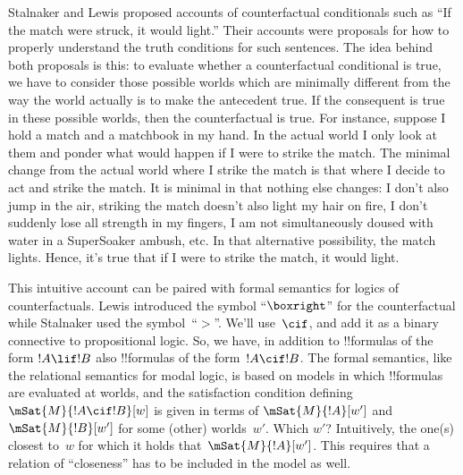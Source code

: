 \documentclass[../../../include/open-logic-section]{subfiles}
\begin{document}


Stalnaker and Lewis proposed accounts of counterfactual conditionals
such as ``If the match were struck, it would light.''  Their accounts
were proposals for how to properly understand the truth conditions for
such sentences. The idea behind both proposals is this: to evaluate
whether a counterfactual conditional is true, we have to consider
those possible worlds which are minimally different from the way the
world actually is to make the antecedent true. If the consequent is
true in these possible worlds, then the counterfactual is true. For
instance, suppose I hold a match and a matchbook in my hand. In the
actual world I only look at them and ponder what would happen if I
were to strike the match. The minimal change from the actual world
where I strike the match is that where I decide to act and strike the
match. It is minimal in that nothing else changes: I don't also jump
in the air, striking the match doesn't also light my hair on fire, I
don't suddenly lose all strength in my fingers, I am not simultaneously
doused with water in a SuperSoaker ambush, etc. In that alternative
possibility, the match lights. Hence, it's true that if I were to
strike the match, it would light.

This intuitive account can be paired with formal semantics for logics
of counterfactuals.  Lewis introduced the symbol ``$\boxright$'' for
the counterfactual while Stalnaker used the symbol~``$>$''. We'll
use~$\cif$, and add it as a binary connective to propositional
logic. So, we have, in addition to !!{formula}s of the form $!A \lif
!B$ also !!{formula}s of the form~$!A \cif !B$. The formal semantics,
like the relational semantics for modal logic, is based on models in
which !!{formula}s are evaluated at worlds, and the satisfaction
condition defining $\mSat{M}{!A \cif !B}[w]$ is given in terms of
$\mSat{M}{!A}[w']$ and $\mSat{M}{!B}[w']$ for some (other)
worlds~$w'$. Which $w'$?  Intuitively, the one(s) closest to~$w$ for
which it holds that~$\mSat{M}{!A}[w']$. This requires that a relation
of ``closeness'' has to be included in the model as well.
\end{document}
